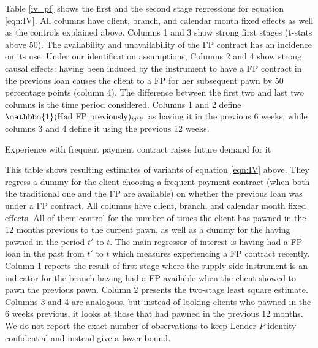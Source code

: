 \documentclass[oneside,11pt]{article}
\begin{document}
Table \ref{iv_pf} shows the first and the second stage regressions for equation \ref{eqn:IV}. All columns have client, branch, and calendar month fixed effects as well as the controls explained above. Columns 1 and 3 show strong first stages (t-stats above 50). The availability and unavailability of the FP contract has an incidence on its use. Under our identification assumptions, Columns 2 and 4 show strong causal effects: having  been induced by the instrument to have a FP contract in the previous loan causes the client to a FP for her subsequent pawn by 50 percentage points (column 4). The difference between the first two and last two columns is the time period considered. Columns 1 and 2 define $\mathbbm{1}(\text{Had FP previously})_{ij't'}$ as having it in the previous 6 weeks, while columns 3 and 4 define it using the previous 12 weeks. 




\begin{table}[H]
\caption{Experience with frequent payment contract raises future demand for it}
\label{iv_pf}
\begin{center}
\footnotesize{}
\end{center}
 \scriptsize
This table shows resulting estimates of variants of equation  \ref{eqn:IV} above. They regress a dummy for the client choosing a frequent payment contract (when both the traditional one and the FP are available) on whether the previous loan was under a FP contract. All columns have client, branch, and calendar month fixed effects. All of them control for the number of times the client has pawned in the 12 months previous to the current pawn, as well as a dummy for the having pawned in the period $t'$ to $t$. The main regressor of interest is having had a FP loan in the past from $t'$ to $t$  which measures experiencing a FP contract recently. Column 1 reports the result of first stage where the supply side instrument is an indicator for the branch having had a FP available when the client showed to pawn the previous pawn. Column 2 presents the two-stage least square estimate. Columns 3 and 4 are analogous, but instead of looking clients who pawned in the 6 weeks previous, it looks at those that had pawned in the previous 12 months. We do not report the exact number of observations to keep Lender $P$ identity confidential and instead give a lower bound. 
\end{table}
\end{document}
